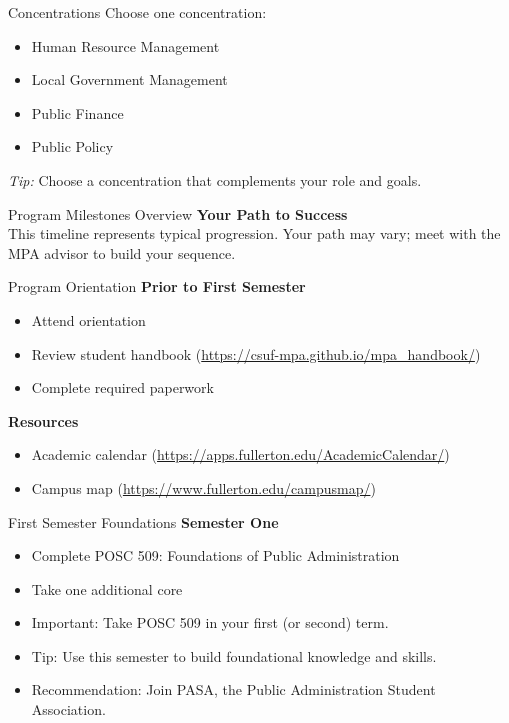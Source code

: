 \documentclass[10pt]{beamer}
\begin{document}
\begin{frame}{Concentrations}
Choose one concentration:
\begin{itemize}
  \item Human Resource Management
  \item Local Government Management
  \item Public Finance
  \item Public Policy
\end{itemize}
\emph{Tip:} Choose a concentration that complements your role and goals.
\end{frame}

\begin{frame}{Program Milestones Overview}
\centering
\textbf{Your Path to Success}\\[4pt]
\small This timeline represents typical progression. Your path may vary; meet with the MPA advisor to build your sequence.
\end{frame}

\begin{frame}{Program Orientation}
\textbf{Prior to First Semester}
\begin{itemize}
  \item Attend orientation
  \item Review student handbook \small(\url{https://csuf-mpa.github.io/mpa_handbook/})
  \item Complete required paperwork
\end{itemize}
\textbf{Resources}
\begin{itemize}
  \item Academic calendar \small(\url{https://apps.fullerton.edu/AcademicCalendar/})
  \item Campus map \small(\url{https://www.fullerton.edu/campusmap/})
\end{itemize}
\end{frame}

\begin{frame}{First Semester Foundations}
\textbf{Semester One}
\begin{itemize}
  \item Complete POSC 509: Foundations of Public Administration
  \item Take one additional core
\end{itemize}
\begin{itemize}
  \item \alert{Important:} Take POSC 509 in your first (or second) term.
  \item \alert{Tip:} Use this semester to build foundational knowledge and skills.
  \item \alert{Recommendation:} Join PASA, the Public Administration Student Association.
\end{itemize}
\end{frame}
\end{document}
